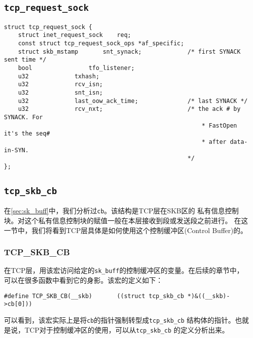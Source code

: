         \subsection{\texttt{tcp_request_sock}}
\begin{verbatim}
struct tcp_request_sock {
    struct inet_request_sock    req;
    const struct tcp_request_sock_ops *af_specific;
    struct skb_mstamp       snt_synack;             /* first SYNACK sent time */
    bool                tfo_listener;
    u32             txhash;
    u32             rcv_isn;
    u32             snt_isn;
    u32             last_oow_ack_time;              /* last SYNACK */
    u32             rcv_nxt;                        /* the ack # by SYNACK. For
                                                        * FastOpen it's the seq#
                                                        * after data-in-SYN.
                                                    */
};
\end{verbatim}
        \subsection{\texttt{tcp_skb_cb}}
			\label{sec:tcp_skb_cb}

			在\ref{sec:sk_buff}中，我们分析过\texttt{cb}。该结构是TCP层在SKB区的
			私有信息控制块。对这个私有信息控制块的赋值一般在本层接收到段或发送段之前进行。
			在这一节中，我们将看到TCP层具体是如何使用这个控制缓冲区(Control Buffer)的。

            \subsubsection{TCP\_SKB\_CB}
				\label{subsec:tcp_skb_cb}

			在TCP层，用该宏访问给定的\texttt{sk_buff}的控制缓冲区的变量。在后续的章节中，
			可以在很多函数中看到它的身影。该宏的定义如下：

\begin{verbatim}
#define TCP_SKB_CB(__skb)       ((struct tcp_skb_cb *)&((__skb)->cb[0]))
\end{verbatim}

			可以看到，该宏实际上是将\texttt{cb}的指针强制转型成\texttt{tcp_skb_cb}
			结构体的指针。也就是说，TCP对于控制缓冲区的使用，可以从\texttt{tcp_skb_cb}
			的定义分析出来。

